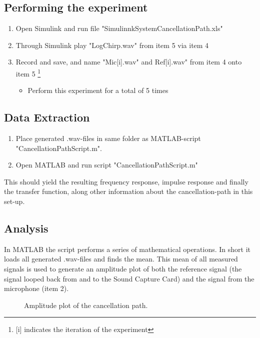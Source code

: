 \subsection{Performing the experiment}
\begin{enumerate}
	\item Open Simulink\textsuperscript{\textregistered} and run file "SimulinnkSystemCancellationPath.xls"
	\item Through Simulink\textsuperscript{\textregistered} play "LogChirp.wav" from item 5 via item 4
	\item Record and save, and name "Mic[i].wav" and Ref[i].wav" from item 4 onto item 5 \footnote{[i] indicates the iteration of the experiment}
	\begin{itemize}
		\item[] Perform this experiment for a total of 5 times
	\end{itemize}
\end{enumerate}


\subsection{Data Extraction}
\begin{enumerate}
	\item Place generated .wav-files in same folder as MATLAB\textsuperscript{\textregistered}-script "CancellationPathScript.m".
	\item Open MATLAB\textsuperscript{\textregistered} and run script "CancellationPathScript.m"
\end{enumerate}
This should yield the resulting frequency response, impulse response and finally the transfer function, along other information about the cancellation-path in this set-up.

\subsection{Analysis}
In MATLAB\textsuperscript{\textregistered} the script performs a series of mathematical operations. In short it loads all generated .wav-files and finds the mean. This mean of all measured signals is used to generate an amplitude plot of both the reference signal (the signal looped back from and to the Sound Capture Card) and the signal from the microphone (item 2).

\begin{figure}[H]
	\centering
	
	\caption{Amplitude plot of the cancellation path.}
	\label{AmplitudePlotCancellationPath}
\end{figure}


